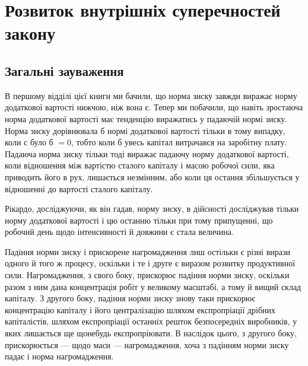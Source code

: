 \section{Розвиток внутрішніх суперечностей закону}
\subsection{Загальні зауваження}

В першому відділі цієї книги ми бачили, що норма зиску завжди виражає норму додаткової вартості
нижчою, ніж вона є. Тепер ми побачили, що навіть зростаюча норма додаткової вартості має тенденцію
виражатись у падаючій нормі зиску. Норма
зиску дорівнювала б нормі додаткової вартості тільки в тому випадку, коли $с$ було б $= 0$, тобто коли б
увесь капітал витрачався на заробітну плату. Падаюча норма зиску тільки тоді виражає падаючу норму
додаткової вартості, коли відношення між вартістю сталого капіталу і масою робочої сили, яка
приводить його в рух, лишається незмінним, або коли ця остання збільшується у відношенні до вартості
сталого капіталу.

Рікардо, досліджуючи, як він гадав, норму зиску, в дійсності досліджував тільки норму додаткової
вартості і цю останню тільки при тому припущенні, що робочий день щодо інтенсивності й довжини є
стала величина.

Падіння норми зиску і прискорене нагромадження лиш остільки є різні вирази одного й того ж процесу,
оскільки і те і друге є виразом розвитку продуктивної сили. Нагромадження, з свого боку, прискорює
падіння норми зиску, оскільки разом з ним
дана концентрація робіт у великому масштабі, а тому й вищий склад капіталу. З другого боку, падіння
норми зиску знову таки прискорює концентрацію капіталу і його централізацію шляхом експропріації
дрібних капіталістів, шляхом експропріації
останніх решток безпосередніх виробників, у яких лишається ще щонебудь експропріювати. В наслідок
цього, з другого боку, прискорюється — щодо маси — нагромадження, хоча з падінням норми зиску падає
і норма нагромадження.

